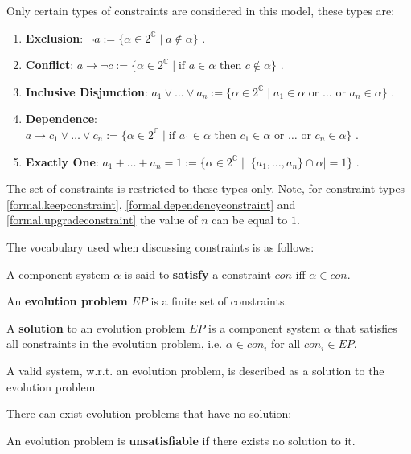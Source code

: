 Only certain types of constraints are considered in this model, these types are:
\begin{enumerate}
  \item \textbf{Exclusion}: $\neg a := \{\alpha \in 2^{\mathbb{C}} \mid a \not \in \alpha \}$ \label{formal.removeconstraint}.
  \item \textbf{Conflict}: $a \rightarrow \neg c := \{\alpha \in 2^{\mathbb{C}} \mid \mbox{if } a \in \alpha \mbox{ then } c \not \in \alpha\}$ \label{formal.conflictconstraint}.
  \item \textbf{Inclusive Disjunction}: $a_1 \vee \ldots \vee a_n := \{\alpha \in 2^{\mathbb{C}} \mid a_1 \in \alpha \mbox{ or }\ldots \mbox{ or } a_n \in \alpha\}$ \label{formal.keepconstraint}.
  \item \textbf{Dependence}: $a \rightarrow c_1 \vee \ldots \vee c_n := \{\alpha \in 2^{\mathbb{C}} \mid \mbox{if } a_1 \in \alpha \mbox{ then }  c_1 \in \alpha \mbox{ or } \ldots \mbox{ or } c_n \in \alpha\}$ \label{formal.dependencyconstraint}.
  \item \textbf{Exactly One}: $a_1 + \ldots + a_n = 1 := \{\alpha \in 2^{\mathbb{C}} \mid |\{a_1,\ldots,a_n\} \cap \alpha| = 1\}$ \label{formal.upgradeconstraint}.
\end{enumerate}
The set of constraints is restricted to these types only. 
Note, for constraint types \ref{formal.keepconstraint}, \ref{formal.dependencyconstraint} and \ref{formal.upgradeconstraint} the value of $n$ can be equal to $1$.

The vocabulary used when discussing constraints is as follows:
\begin{defs}
\label{formal.constraintdefs}
A component system $\alpha$ is said to \textbf{satisfy} a constraint $con$ iff $\alpha \in con$.
\end{defs}

\begin{defs}
An \textbf{evolution problem} $EP$ is a finite set of constraints.
\end{defs}

\begin{defs}
A \textbf{solution} to an evolution problem $EP$ is a component system  $\alpha$  that satisfies all constraints in the evolution problem, i.e. $\alpha \in con_i$ for all $con_i \in EP$.  
\end{defs}
A valid system, w.r.t. an evolution problem, is described as a solution to the evolution problem.

There can exist evolution problems that have no solution: 
\begin{defs}
An evolution problem is \textbf{unsatisfiable} if there exists no solution to it.  
\end{defs}


